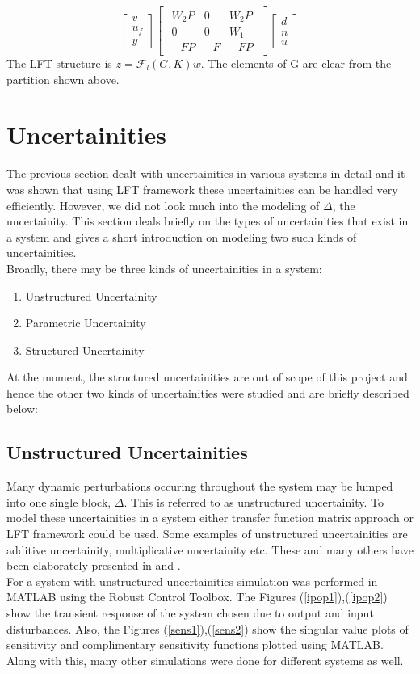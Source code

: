 \documentclass[a4paper,12pt]{article}
\begin{document}
				\[
				\begin{bmatrix}
					v \\ u_{f} \\ \hline y
				\end{bmatrix}
				\begin{bmatrix}
					\begin{array}{cc|c}
						W_{2}P & 0 & W_{2}P \\
						0 & 0 & W_{1} \\ \hline
						-FP & -F & -FP
					\end{array}
				\end{bmatrix}
				\begin{bmatrix}
					d\\n\\ \hline u
				\end{bmatrix}
				\]
				The LFT structure is $z=\mathscr{F}_{l}(G,K)w$. The elements of G are clear from the partition shown above.
		\section{Uncertainities}The previous section dealt with uncertainities in various systems in detail and it was shown that using LFT framework these uncertainities can be handled very efficiently. However, we did not look much into the modeling of $\Delta$, the uncertainity. This section deals briefly on the types of uncertainities that exist in a system and gives a short introduction on modeling two such kinds of uncertainities. \\
		Broadly, there may be three kinds of uncertainities in a system:
		\begin{enumerate}
			\item Unstructured Uncertainity
			\item Parametric Uncertainity
			\item Structured Uncertainity
		\end{enumerate}
		At the moment, the structured uncertainities are out of scope of this project and hence the other two kinds of uncertainities were studied and are briefly described below: 
			\subsection{Unstructured Uncertainities} Many dynamic perturbations occuring throughout the system may be lumped into one single block, $\Delta$. This is referred to as unstructured uncertainity. To model these uncertainities in a system either transfer function matrix approach or LFT framework could be used. Some examples of unstructured uncertainities are additive uncertainity, multiplicative uncertainity etc. These and many others have been elaborately presented in \cite{book} and \cite{Gu}.\\
			For a system with unstructured uncertainities simulation was performed in MATLAB using the Robust Control Toolbox. The Figures (\ref{ipop1}),(\ref{ipop2}) show the transient response of the system chosen due to output and input disturbances. Also, the Figures (\ref{sens1}),(\ref{sens2}) show the singular value plots of sensitivity and complimentary sensitivity functions plotted using MATLAB. Along with this, many other simulations were done for different systems as well.
\end{document}

